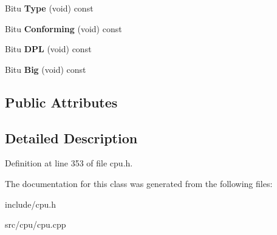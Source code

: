 \begin{DoxyCompactItemize}
\item 
\hypertarget{classDescriptor_a7c881ad7757005c45841a2d80d0ec368}{Bitu {\bfseries Type} (void) const }\label{classDescriptor_a7c881ad7757005c45841a2d80d0ec368}

\item 
\hypertarget{classDescriptor_afa0f36bc7446c8d1f861c74142ed5e78}{Bitu {\bfseries Conforming} (void) const }\label{classDescriptor_afa0f36bc7446c8d1f861c74142ed5e78}

\item 
\hypertarget{classDescriptor_a7b06a79d297d2632bd592f9464d3d2f6}{Bitu {\bfseries D\-P\-L} (void) const }\label{classDescriptor_a7b06a79d297d2632bd592f9464d3d2f6}

\item 
\hypertarget{classDescriptor_a13c26f622c45aaaedcfdbefe471b9e59}{Bitu {\bfseries Big} (void) const }\label{classDescriptor_a13c26f622c45aaaedcfdbefe471b9e59}

\end{DoxyCompactItemize}
\subsection*{Public Attributes}


\subsection{Detailed Description}


Definition at line 353 of file cpu.\-h.



The documentation for this class was generated from the following files\-:\begin{DoxyCompactItemize}
\item 
include/cpu.\-h\item 
src/cpu/cpu.\-cpp\end{DoxyCompactItemize}

